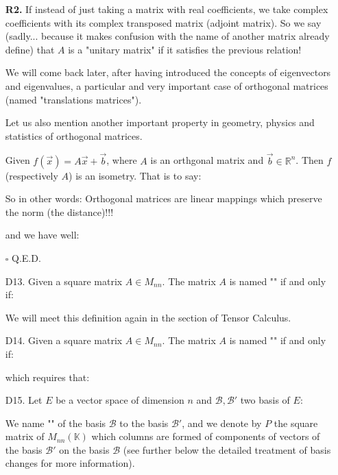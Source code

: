 \begin{enumerate}
\begin{tcolorbox}[title=Remarks,colframe=black,arc=10pt]
		\textbf{R2.} If instead of just taking a matrix with real coefficients, we take complex coefficients with its complex transposed matrix (adjoint matrix). So we say (sadly... because it makes confusion with the name of another matrix already define) that $A$ is a "unitary matrix" if it satisfies the previous relation!
		\end{tcolorbox}
		We will come back later, after having introduced the concepts of eigenvectors and eigenvalues, a particular and very important case of orthogonal matrices (named "translations matrices").
		
		Let us also mention another important property in geometry, physics and statistics of orthogonal matrices.
		
		\begin{theorem}
		Given $f(\vec{x})=A\vec{x}+\vec{b}$, where $A$ is an orthgonal matrix and $\vec{b}\in \mathbb{R}^n$. Then $f$ (respectively $A$) is an isometry. That is to say:
		
		So in other words: Orthogonal matrices are linear mappings which preserve the norm (the distance)!!!
		\end{theorem}
		\begin{dem}
		
		and we have well:
		
		\begin{flushright}
			$\square$  Q.E.D.
		\end{flushright}
		\end{dem}
		
		\item[D13.] Given a square matrix $A \in M_{nn}$. The matrix $A$ is named "" if and only if:
		
		We will meet this definition again in the section of Tensor Calculus.
		
		\item[D14.] Given a square matrix $A \in M_{nn}$. The matrix $A$ is named "" if and only if:
		
		which requires that:
		
		
		\item[D15.] Let $E$ be a vector space of dimension $n$ and $ \mathcal{B},\mathcal{B}'$ two basis of $E$:
		
		We name "" of the basis $\mathcal{B}$ to the basis  $\mathcal{B}'$, and we denote by $P$ the square matrix of $M_{nn}(\mathbb{K})$ which columns are formed of components of vectors of the basis $\mathcal{B}'$ on the basis $\mathcal{B}$ (see further below the detailed treatment of basis changes for more information).
		

\end{enumerate}
